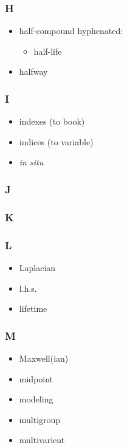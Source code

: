 \documentclass[10pt, letter]{article}
\begin{document}
\begin{multicols}{2}
\subsubsection*{H}
\begin{itemize}
\item half-compound hyphenated:
  \begin{itemize}
  \item half-life
  \end{itemize}
\item halfway
\end{itemize}

\subsubsection*{I}
\begin{itemize}
\item indexes (to book)
\item indices (to variable)
\item \textit{in situ}
\end{itemize}

\subsubsection*{J}
\subsubsection*{K}

\subsubsection*{L}
\begin{itemize}
\item Laplacian
\item l.h.s.
\item lifetime
\end{itemize}

\subsubsection*{M}
\begin{itemize}
\item Maxwell(ian)
\item midpoint
\item modeling
\item multigroup
\item multivarient
\end{itemize}


\end{multicols}
\end{document}
